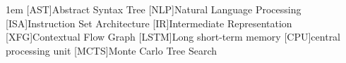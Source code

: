 \begin{acronym}[MCTS]\itemsep1em
    [AST]{Abstract Syntax Tree}
    [NLP]{Natural Language Processing}
    [ISA]{Instruction Set Architecture}
    [IR]{Intermediate Representation}
    [XFG]{Contextual Flow Graph}
    [LSTM]{Long short-term memory}
    [CPU]{central processing unit}
    [MCTS]{Monte Carlo Tree Search}
\end{acronym}
